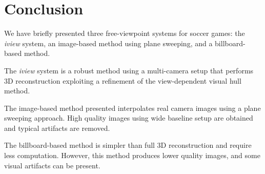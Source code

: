 \section{Conclusion}
We have briefly presented three free-viewpoint systems for soccer games: the \textit{iview} system, an image-based method using 
plane sweeping, and a billboard-based method.

The \textit{iview} system is a robust method using a multi-camera setup that performs 3D reconstruction exploiting a refinement 
of the view-dependent visual hull method.

The image-based method presented interpolates real camera images using a plane sweeping approach.
High quality images using wide baseline setup are obtained and typical artifacts are removed.

The billboard-based method is simpler than full 3D reconstruction and require less computation.
However, this method produces lower quality images, and some visual artifacts can be present.

